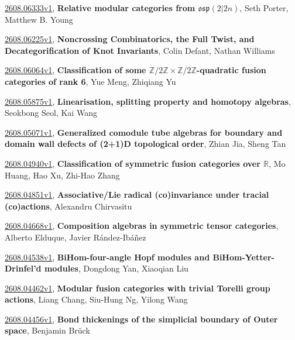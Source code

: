 \documentclass[9pt, a4paper]{article}
\theoremstyle{plain}
\theoremstyle{definition}
\theoremstyle{remark}
\newcommand{\arxiv}[3]{\href{https://arxiv.org/abs/#1}{#1}, \textbf{\textcolor{arxivblue}{#2}}, #3}
\begin{document}
\arxiv{2608.06333v1}{Relative modular categories from $\mathfrak{osp}(2 \vert 2n)$}{Seth Porter, Matthew B. Young}

\arxiv{2608.06225v1}{Noncrossing Combinatorics, the Full Twist, and Decategorification of Knot Invariants}{Colin Defant, Nathan Williams}

\arxiv{2608.06064v1}{Classification of some $\mathbb{Z}/2\mathbb{Z}\times \mathbb{Z}/2\mathbb{Z}$-quadratic fusion categories of rank 6}{Yue Meng, Zhiqiang Yu}

\arxiv{2608.05875v1}{Linearisation, splitting property and homotopy algebras}{Seokbong Seol, Kai Wang}

\arxiv{2608.05071v1}{Generalized comodule tube algebras for boundary and domain wall defects of (2+1)D topological order}{Zhian Jia, Sheng Tan}

\arxiv{2608.04940v1}{Classification of symmetric fusion categories over $\mathbb{R}$}{Mo Huang, Hao Xu, Zhi-Hao Zhang}

\arxiv{2608.04851v1}{Associative/Lie radical (co)invariance under tracial (co)actions}{Alexandru Chirvasitu}

\arxiv{2608.04668v1}{Composition algebras in symmetric tensor categories}{Alberto Elduque, Javier Rández-Ibáñez}

\arxiv{2608.04538v1}{BiHom-four-angle Hopf modules and BiHom-Yetter-Drinfel'd modules}{Dongdong Yan, Xiaoqian Liu}

\arxiv{2608.04462v1}{Modular fusion categories with trivial Torelli group actions}{Liang Chang, Siu-Hung Ng, Yilong Wang}

\arxiv{2608.04456v1}{Bond thickenings of the simplicial boundary of Outer space}{Benjamin Brück}

\end{document}
